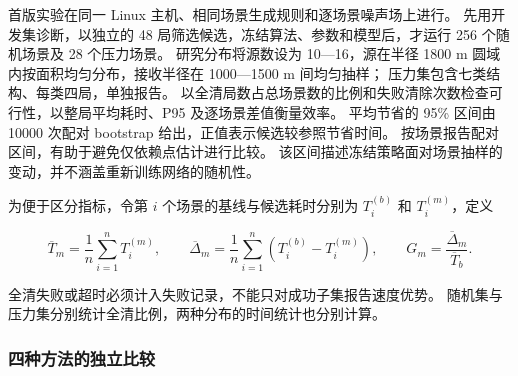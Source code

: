 \documentclass[UTF8,a4paper,zihao=5,fontset=fandol]{ctexart}
\begin{document}
首版实验在同一 Linux 主机、相同场景生成规则和逐场景噪声场上进行。
先用开发集诊断，以独立的 48 局筛选候选，冻结算法、参数和模型后，才运行 256 个随机场景及 28 个压力场景。
研究分布将源数设为 10---16，源在半径 1800 m 圆域内按面积均匀分布，接收半径在 1000---1500 m 间均匀抽样；
压力集包含七类结构、每类四局，单独报告。
以全清局数占总场景数的比例和失败清除次数检查可行性，以整局平均耗时、P95 及逐场景差值衡量效率。
平均节省的 95\% 区间由 10000 次配对 bootstrap 给出，正值表示候选较参照节省时间。
按场景报告配对区间，有助于避免仅依赖点估计进行比较\cite{agarwal2021}。
该区间描述冻结策略面对场景抽样的变动，并不涵盖重新训练网络的随机性。

为便于区分指标，令第 \(i\) 个场景的基线与候选耗时分别为 \(T_i^{(b)}\) 和 \(T_i^{(m)}\)，定义

\begin{equation}\label{eq:q3-17}
\overline T_m=\frac1n\sum_{i=1}^nT_i^{(m)},\qquad
\overline\Delta_m=\frac1n\sum_{i=1}^n(T_i^{(b)}-T_i^{(m)}),\qquad
G_m=\frac{\overline\Delta_m}{\overline T_b}.
\end{equation}

全清失败或超时必须计入失败记录，不能只对成功子集报告速度优势。
随机集与压力集分别统计全清比例，两种分布的时间统计也分别计算。

\Needspace{82mm}
\subsubsection{四种方法的独立比较}\label{sec:q3-9}
\end{document}
